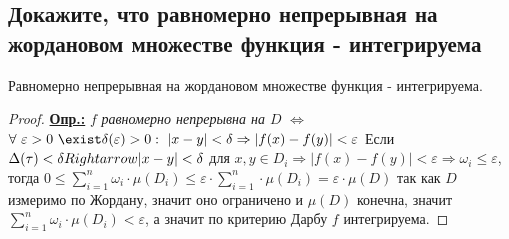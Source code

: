 
\subsection{Докажите, что равномерно непрерывная на жордановом множестве функция - интегрируема}

\begin{theorem*}
    Равномерно непрерывная на жордановом множестве функция - интегрируема.
\end{theorem*}

\begin{proof}
    \textbf{\underline{Опр.:} } $f$ \textit{равномерно непрерывна на $D$} $\Leftrightarrow$ $\forall\ \varepsilon>0\ \exist\delta(\varepsilon) >0:\ |x-y|<\delta\Rightarrow |f(x)-f(y)|<\varepsilon$
    Если $\Delta(\tau) < \delta\\Rightarrow |x-y|<\delta$ для $x,y\in D_i\Rightarrow |f(x)-f(y)|<\varepsilon\Rightarrow \omega_i\leq \varepsilon$, тогда
    $0\leq \sum\limits_{i=1}^n \omega_i\cdot\mu(D_i)\leq \varepsilon\cdot\sum\limits_{i=1}^n \cdot\mu(D_i)=\varepsilon\cdot\mu(D)$
    так как $D$ измеримо по Жордану, значит оно ограничено и $\mu(D)$ конечна, значит $\sum\limits_{i=1}^n \omega_i\cdot\mu(D_i)<\varepsilon$, а значит по критерию Дарбу $f$ интегрируема.
    
\end{proof}
